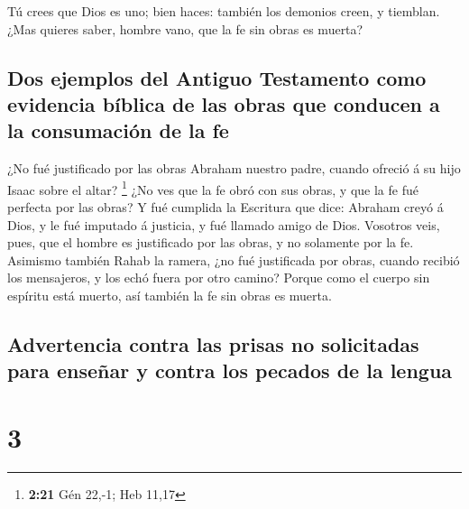  Tú crees que Dios es uno; bien haces: también los
demonios creen, y tiemblan.  ¿Mas quieres saber, hombre
vano, que la fe sin obras es muerta?

\hypertarget{dos-ejemplos-del-antiguo-testamento-como-evidencia-buxedblica-de-las-obras-que-conducen-a-la-consumaciuxf3n-de-la-fe}{%
\subsection{Dos ejemplos del Antiguo Testamento como evidencia bíblica
de las obras que conducen a la consumación de la
fe}\label{dos-ejemplos-del-antiguo-testamento-como-evidencia-buxedblica-de-las-obras-que-conducen-a-la-consumaciuxf3n-de-la-fe}}

 ¿No fué justificado por las obras Abraham nuestro padre,
cuando ofreció á su hijo Isaac sobre el altar? \footnote{\textbf{2:21}
  Gén 22,-1; Heb 11,17}  ¿No ves que la fe obró con sus
obras, y que la fe fué perfecta por las obras?  Y fué
cumplida la Escritura que dice: Abraham creyó á Dios, y le fué imputado
á justicia, y fué llamado amigo de Dios.  Vosotros veis,
pues, que el hombre es justificado por las obras, y no solamente por la
fe.  Asimismo también Rahab la ramera, ¿no fué
justificada por obras, cuando recibió los mensajeros, y los echó fuera
por otro camino?  Porque como el cuerpo sin espíritu está
muerto, así también la fe sin obras es muerta.

\hypertarget{advertencia-contra-las-prisas-no-solicitadas-para-enseuxf1ar-y-contra-los-pecados-de-la-lengua}{%
\subsection{Advertencia contra las prisas no solicitadas para enseñar y
contra los pecados de la
lengua}\label{advertencia-contra-las-prisas-no-solicitadas-para-enseuxf1ar-y-contra-los-pecados-de-la-lengua}}

\hypertarget{section-2}{%
\section{3}\label{section-2}}

